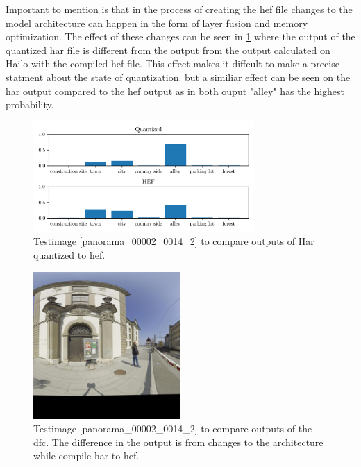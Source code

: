 Important to mention is that in the process of creating the \acrshort{hef} file changes to the model architecture can happen in the form of 
layer fusion and memory optimization.
The effect of these changes can be seen in \cref{methods:fig:comparern50harhef} where the output of the quantized \acrshort{har} file is different from the output from the output calculated on Hailo with the compiled \acrshort{hef} file.
This effect makes it diffcult to make a precise statment about the state of quantization.
but a similiar effect can be seen on the \acrshort{har} output compared to the \acrshort{hef} output as in both ouput "alley" has the highest probability.

\begin{figure}
    \centering
    \includegraphics[width=0.75\textwidth]{Images/Implementation/compareProbs_RN50_quant_Hef.png}
    \caption{Testimage [panorama\_00002\_0014\_2] to compare outputs of Har quantized to \acrshort{hef}.}
    \label{methods:fig:comparern50harhef}
\end{figure}

\begin{figure}
    \centering
    \includegraphics[width=0.5\textwidth]{Images/Implementation/panorama_00002_0014_2_testIMg.jpg}
    \caption{Testimage [panorama\_00002\_0014\_2] to compare outputs of the \acrshort{dfc}. The difference in the output is from changes to the architecture while compile \acrshort{har} to \acrshort{hef}.}
    \label{methods:fig:comparetestpic}
\end{figure}



